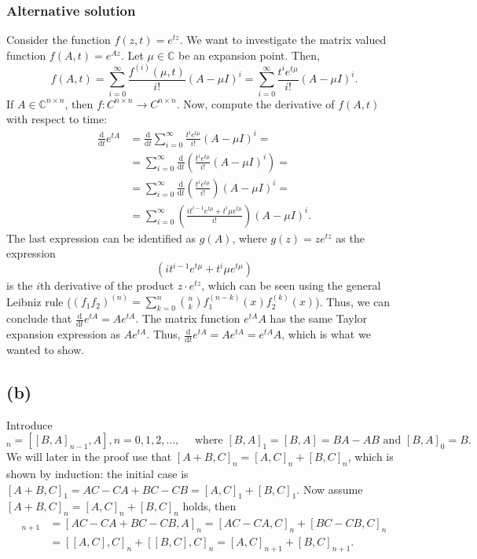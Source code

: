 \subsubsection*{Alternative solution}
Consider the function $f(z,t) = e^{tz}$. We want to investigate the matrix valued function $f(A,t) = e^{Az}$. Let $\mu \in \mathbb{C}$ be an expansion point. Then,
\begin{equation}
  f(A,t) = \sum\limits_{i = 0}^{\infty} \frac{f^{(i)}(\mu,t)}{i!}(A-\mu I)^{i} = \sum\limits_{i = 0}^{\infty} \frac{t^ie^{t\mu}}{i!}(A-\mu I)^{i}.
\end{equation}
If $A\in\mathbb{C}^{n\times n}$, then $f:C^{n \times n}\rightarrow C^{n \times n}$. Now, compute the derivative of $f(A,t)$ with respect to time:
\begin{equation}
\begin{aligned}
\frac{\mathrm d}{\mathrm d t}e^{tA} & = \frac{\mathrm d}{\mathrm dt}\sum^{\infty}_{i = 0} \frac{t^ie^{t\mu}}{i!}(A-\mu I )^i = \\
& = \sum^{\infty}_{i = 0} \frac{\mathrm d}{\mathrm dt}\left(\frac{t^ie^{t\mu}}{i!}(A-\mu I )^i\right) = \\
& = \sum^{\infty}_{i = 0} \frac{\mathrm d}{\mathrm dt}\left(\frac{t^ie^{t\mu}}{i!}\right)(A-\mu I )^i  = \\
&= \sum^{\infty}_{i = 0}  \left(\frac{it^{i-1}e^{t\mu}+t^i\mu e^{t\mu}}{i!}\right) (A-\mu I )^i.
\end{aligned}
\end{equation}
The last expression can be identified as $g(A)$, where $g(z) = ze^{tz}$ as  the expression
\begin{equation}
\left(it^{i-1}e^{t\mu}+t^i\mu e^{t\mu}\right)
\end{equation}
is the $i$th derivative of the product $z\cdot e^{tz}$, which can be seen using the general Leibniz rule ($(f_1f_2)^{(n)} = \sum_{k = 0}^n\binom{n}{k}f_1^{(n-k)}(x)f_2^{(k)}(x)$). Thus, we can conclude that $\frac{\mathrm d }{\mathrm dt}e^{tA} = Ae^{tA}$. The matrix function $e^{tA}A$ has the same Taylor expansion expression as $Ae^{tA}$. Thus, $\frac{\mathrm d }{\mathrm dt}e^{tA} = Ae^{tA} = e^{tA} A$, which is what we wanted to show.

\subsection*{(b)}
Introduce
\begin{equation}
[B,A]_{n} =  [[B,A]_{n-1},A], n = 0,1,2,\ldots, \quad \text{ where }[B,A]_{1} = [B,A] = BA-AB \text{ and } [B,A]_{0} = B.
\end{equation}
We will later in the proof use that $[A+B,C]_{n} = [A,C]_{n} + [B,C]_{n}$, which is shown by induction: the initial case is $[A+B,C]_{1} = AC-CA + BC-CB = [A,C]_{1}+[B,C]_{1}$. Now assume $[A+B,C]_{n} = [A,C]_{n} + [B,C]_{n}$ holds, then
\begin{align}
[A+B,C]_{n+1} &=  [AC-CA + BC-CB,A]_{n} = [AC-CA,C]_{n} + [BC-CB,C]_{n} \\
&= [[A,C],C]_{n} + [[B,C],C]_{n}=[A,C]_{n+1} + [B,C]_{n+1}.
\end{align}


